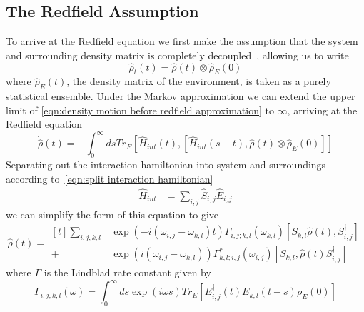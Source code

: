 \subsection{The Redfield Assumption}\label{sec:the redfield assumption}
To arrive at the Redfield equation
we first make the assumption that the
system and surrounding density
matrix is completely
decoupled~\cite{theory_open_quantum_systems},
allowing us to write
\begin{equation}
    \hat{\rho}_t(t) = \hat{\rho}(t) \otimes \hat{\rho}_E(0)
\end{equation}
where \(\hat{\rho}_E(t)\), the
density matrix of the environment,
is taken as a purely statistical ensemble.
Under the Markov approximation
we can extend the upper limit
of \cref{eqn:density motion before redfield approximation}
to \(\infty \), arriving at the Redfield
equation
\begin{equation}
    \dot{\hat{\rho}}(t) =
    - \int_0^{\infty} ds
    Tr_{E}[\hat{H}_{int}(t),
            [\hat{H}_{int}(s-t),
                    \hat{\rho}(t) \otimes \hat{\rho}_E(0)]]
\end{equation}
Separating out the interaction hamiltonian
into system and surroundings according
to~\cref{eqn:split interaction hamiltonian}
\begin{align}
    \hat{H}_{int} & = \sum_{i,j} \hat{S}_{i,j} \hat{E}_{i,j}
\end{align}
we can simplify the form of this equation\cite{Manzano_2020} to give
\begin{equation}
    \dot{\hat{\rho{}}}(t) = \begin{aligned}[t]
        \sum_{i,j,k, l} &
        \exp{(-i(\omega_{i,j}-\omega_{k,l})t)}
        \Gamma_{i,j;k, l}(\omega_{k,l})
        [S_{k, l}\hat{\rho}(t),
        S^\dagger_{i,j}]  \\
        +               &
        \exp{(i(\omega_{i,j}-\omega_{k,l}))}
        \Gamma^*_{k, l; i,j}(\omega_{i,j})
        [S_{k, l},
            \hat{\rho}(t) S^\dagger_{i,j}]
    \end{aligned} \label{eqn:redfield equation gamma form}
\end{equation}
where \(\Gamma \) is the
Lindblad rate constant given by
\begin{equation}
    \Gamma_{i,j, k,l}(\omega) =
    \int_0^\infty{}{
    ds \exp{(i\omega{}s)}
    Tr_{E}[E^\dagger_{i,j}(t)E_{k,l}(t-s)\rho_E(0)]
    }\label{eqn:gamma definition}
\end{equation}

